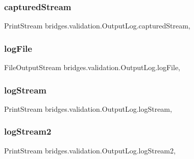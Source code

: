 \subsubsection{\texorpdfstring{captured\+Stream}{capturedStream}}
{\footnotesize\ttfamily Print\+Stream bridges.\+validation.\+Output\+Log.\+captured\+Stream\hspace{0.3cm}{\ttfamily [static]}, {\ttfamily [protected]}}

\hypertarget{classbridges_1_1validation_1_1_output_log_a0e10e95bbb841f1f17b3b363461db3f3}{}\label{classbridges_1_1validation_1_1_output_log_a0e10e95bbb841f1f17b3b363461db3f3} 
\subsubsection{\texorpdfstring{log\+File}{logFile}}
{\footnotesize\ttfamily File\+Output\+Stream bridges.\+validation.\+Output\+Log.\+log\+File\hspace{0.3cm}{\ttfamily [static]}, {\ttfamily [protected]}}

\hypertarget{classbridges_1_1validation_1_1_output_log_a007a8494bdda0f4164663df8afe2c392}{}\label{classbridges_1_1validation_1_1_output_log_a007a8494bdda0f4164663df8afe2c392} 
\subsubsection{\texorpdfstring{log\+Stream}{logStream}}
{\footnotesize\ttfamily Print\+Stream bridges.\+validation.\+Output\+Log.\+log\+Stream\hspace{0.3cm}{\ttfamily [static]}, {\ttfamily [protected]}}

\hypertarget{classbridges_1_1validation_1_1_output_log_a3b5198266da9d86da13fab21c096f18c}{}\label{classbridges_1_1validation_1_1_output_log_a3b5198266da9d86da13fab21c096f18c} 
\subsubsection{\texorpdfstring{log\+Stream2}{logStream2}}
{\footnotesize\ttfamily Print\+Stream bridges.\+validation.\+Output\+Log.\+log\+Stream2\hspace{0.3cm}{\ttfamily [static]}, {\ttfamily [protected]}}

